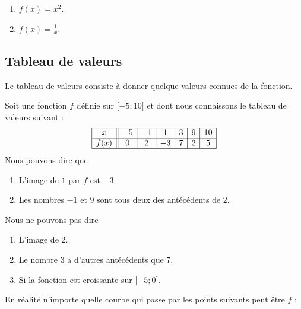 \begin{example}
    \begin{enumerate}
        \item
            \( f(x)=x^2\).
        \item
            \( f(x)=\frac{1}{ x }\).
    \end{enumerate}
\end{example}

\subsection{Tableau de valeurs}

Le tableau de valeurs consiste à donner quelque valeurs connues de la fonction.

\begin{example}
    Soit une fonction \( f\) définie sur \( \mathopen[ -5 ; 10 \mathclose]\) et dont nous connaissons le tableau de valeurs suivant :
    \begin{equation}
        \begin{array}[h]{|c||c|c|c|c|c|c|}
            \hline
            x&-5&-1&1&3&9&10\\
            \hline
            f(x)&0&2&-3&7&2&5\\
            \hline
        \end{array}
    \end{equation}
    Nous pouvons dire que
    \begin{enumerate}
        \item
            L'image de \( 1\) par \( f\) est \( -3\).
        \item
            Les nombres \( -1\) et \( 9\) sont tous deux des antécédents de \( 2\).
    \end{enumerate}
    Nous ne pouvons pas dire 
    \begin{enumerate}
        \item
            L'image de \( 2\).
        \item
            Le nombre \( 3\) a d'autres antécédents que \( 7\).
        \item
            Si la fonction est croissante sur \( \mathopen[ -5 ;0 \mathclose]\).
    \end{enumerate}


    En réalité n'importe quelle courbe qui passe par les points suivants peut être \( f\) :
    \begin{center}
   
    \end{center}

\end{example}

